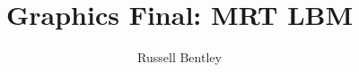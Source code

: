 \documentclass[10pt]{article}
\title{Graphics Final: MRT LBM}
\author{Russell Bentley}
\begin{document}
\maketitle

\tableofcontents

\twocolumn













\printbibliography
\end{document}

